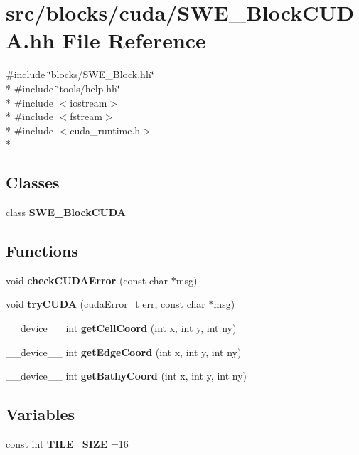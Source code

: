 \section{src/blocks/cuda/\-S\-W\-E\-\_\-\-Block\-C\-U\-D\-A.hh File Reference}
\label{SWE__BlockCUDA_8hh}
{\ttfamily \#include \char`\"{}blocks/\-S\-W\-E\-\_\-\-Block.\-hh\char`\"{}}\\*
{\ttfamily \#include \char`\"{}tools/help.\-hh\char`\"{}}\\*
{\ttfamily \#include $<$iostream$>$}\\*
{\ttfamily \#include $<$fstream$>$}\\*
{\ttfamily \#include $<$cuda\-\_\-runtime.\-h$>$}\\*
\subsection*{Classes}
\begin{DoxyCompactItemize}
\item 
class {\bf S\-W\-E\-\_\-\-Block\-C\-U\-D\-A}
\end{DoxyCompactItemize}
\subsection*{Functions}
\begin{DoxyCompactItemize}
\item 
void {\bfseries check\-C\-U\-D\-A\-Error} (const char $\ast$msg)\label{SWE__BlockCUDA_8hh_a3b360c7adecc62da0141b3c82e753c77}

\item 
void {\bfseries try\-C\-U\-D\-A} (cuda\-Error\-\_\-t err, const char $\ast$msg)\label{SWE__BlockCUDA_8hh_a0cda924127c6de7246554ed6b80917e5}

\item 
\-\_\-\-\_\-device\-\_\-\-\_\- int {\bf get\-Cell\-Coord} (int x, int y, int ny)
\item 
\-\_\-\-\_\-device\-\_\-\-\_\- int {\bf get\-Edge\-Coord} (int x, int y, int ny)
\item 
\-\_\-\-\_\-device\-\_\-\-\_\- int {\bf get\-Bathy\-Coord} (int x, int y, int ny)
\end{DoxyCompactItemize}
\subsection*{Variables}
\begin{DoxyCompactItemize}
\item 
const int {\bfseries T\-I\-L\-E\-\_\-\-S\-I\-Z\-E} =16\label{SWE__BlockCUDA_8hh_a8adcd57e318ecb77a2ffe6ec188f005b}

\end{DoxyCompactItemize}


